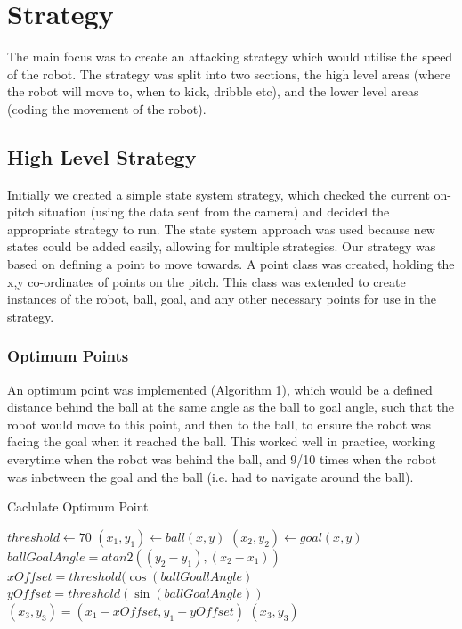 \section{Strategy}

The main focus was to create an attacking strategy which would utilise the speed of the robot. The strategy was split into two sections, the high level areas (where the robot will move to, when to kick, dribble etc), and the lower level areas (coding the movement of the robot).

\subsection{High Level Strategy}
Initially we created a simple state system strategy, which checked the current on-pitch situation (using the data sent from the camera) and decided the appropriate strategy to run. The state system approach was used because new states could be added easily, allowing for multiple strategies.
Our strategy was based on defining a point to move towards. A point class was created, holding the x,y co-ordinates of points on the pitch. This class was extended to create instances of the robot, ball, goal, and any other necessary points for use in the strategy.\linebreak

\subsubsection{Optimum Points}
An optimum point was implemented (Algorithm 1), which would be a defined distance behind the ball at the same angle as the ball to goal angle, such that the robot would move to this point, and then to the ball, to ensure the robot was facing the goal when it reached the ball. This worked well in practice, working everytime when the robot was behind the ball, and 9/10 times when the robot was inbetween the goal and the ball (i.e. had to navigate around the ball).

\begin{algorithm}
\caption{Caclulate Optimum Point}
\label{optimumPoint}
\begin{algorithmic}[1]
\STATE $threshold \gets 70$
\STATE $(x_{1}, y_{1}) \gets ball (x, y)$
\STATE $(x_{2}, y_{2}) \gets goal (x, y)$
\STATE $ballGoalAngle = atan2( (y_{2} - y_{1}), (x_{2} - x_{1}) )$
\STATE $xOffset = threshold(\cos(ballGoallAngle)$
\STATE $yOffset = threshold(\sin(ballGoalAngle))$
\STATE $(x_{3}, y_{3}) = (x_{1} - xOffset, y_{1} - yOffset)$
\RETURN $(x_{3}, y_{3})$
\end{algorithmic}
\end{algorithm}


